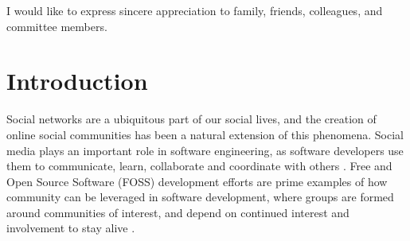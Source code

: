 \documentclass[12pt,letterpaper]{gthesis2}  %
\begin{document}
\indent I would like to express sincere appreciation to family, friends, colleagues, and committee members.
%
%
%
%
\clearpage
%
%
\tableofcontents %
%
%
\clearpage
%
%
\listoffigures %
\clearpage
%
%
\listoftables %
\clearpage
%
%
\listofappendices
\clearpage
%
%
%
%
%
%
%
%
%
%
%
%
%
\DisplayTitle \vspace*{2em} \pagestyle{myheadings}
\setcounter{page}{1} \thispagestyle{empty}

%
\section{Introduction}
\label{introduction}

Social networks are a ubiquitous part of our social lives, and the creation of online social communities has been a natural extension of this phenomena. Social media plays an important role in software engineering, as software developers use them to communicate, learn, collaborate and coordinate with others \cite{Storey}. Free and Open Source Software (FOSS) development efforts are prime examples of how community can be leveraged in software development, where groups are formed around communities of interest, and depend on continued interest and involvement to stay alive \cite{NymanCodeForking}.
\end{document}
